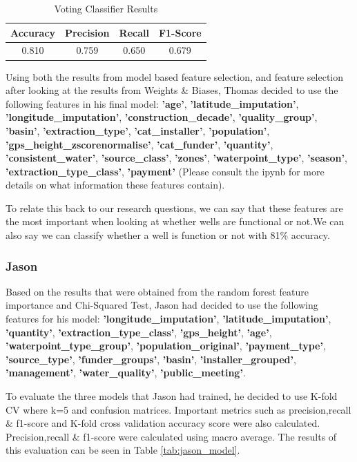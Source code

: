 \documentclass[conference]{IEEEtran}
\begin{document}
\begin{table}[H]
  \centering
  \caption{Voting Classifier Results}
  \label{tab:voting_classification_results}
  \begin{tabular}{|c|c|c|c|}
    \hline
    Accuracy & Precision & Recall & F1-Score \\
    \hline
    0.810 & 0.759 & 0.650 & 0.679 \\
    \hline
  \end{tabular}
\end{table}

Using both the results from model based feature selection, and feature selection after looking at the results from Weights \& Biases, Thomas decided to use the following features in his final model: \textbf{'age'}, \textbf{'latitude\_imputation'}, \textbf{'longitude\_imputation'}, \textbf{'construction\_decade'}, \textbf{'quality\_group'}, \textbf{'basin'}, \textbf{'extraction\_type'}, \textbf{'cat\_installer'}, \textbf{'population'}, \textbf{'gps\_height\_zscorenormalise'}, \textbf{'cat\_funder'}, \textbf{'quantity'}, \textbf{'consistent\_water'}, \textbf{'source\_class'}, \textbf{'zones'}, \textbf{'waterpoint\_type'}, \textbf{'season'}, \textbf{'extraction\_type\_class'}, \textbf{'payment'} (Please consult the ipynb for more details on what information these features contain).

To relate this back to our research questions, we can say that these features are the most important when looking at whether wells are functional or not.We can also say we can classify whether a well is function or not with 81\% accuracy.

\subsubsection{Jason}

Based on the results that were obtained from the random forest feature importance and Chi-Squared Test, Jason had decided to use the following features for his model: \textbf{'longitude\_imputation'}, \textbf{'latitude\_imputation'}, \textbf{'quantity'}, \textbf{'extraction\_type\_class'}, \textbf{'gps\_height'}, \textbf{'age'}, \textbf{'waterpoint\_type\_group'}, \textbf{'population\_original'}, \textbf{'payment\_type'}, \textbf{'source\_type'}, \textbf{'funder\_groups'}, \textbf{'basin'}, \textbf{'installer\_grouped'}, \textbf{'management'}, \textbf{'water\_quality'}, \textbf{'public\_meeting'}.

To evaluate the three models that Jason had trained, he decided to use K-fold CV where k=5 and confusion matrices. Important metrics such as precision,recall \& f1-score and K-fold cross validation accuracy score were also calculated. Precision,recall \& f1-score were calculated using macro average. The results of this evaluation can be seen in Table \ref{tab:jason_model}.
\end{document}
